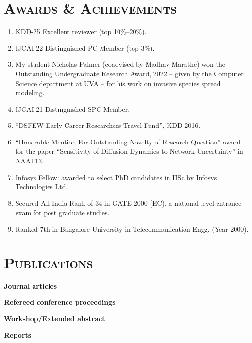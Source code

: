 \documentclass[margin,10pt]{res}
\begin{document}
\begin{resume}
\section{\textnormal{\textsc{Awards \& Achievements}}}
\begin{enumerate}[$\circ$]
    \item KDD-25 Excellent reviewer (top 10\%--20\%).
    \item IJCAI-22 Distinguished PC Member (top 3\%).
\item My student Nicholas Palmer (coadvised by Madhav Marathe) won the
Outstanding Undergraduate Research Award, 2022 -- given by the Computer
Science department at UVA -- for his work on invasive species spread
modeling.
    \item IJCAI-21 Distinguished SPC Member.
   \item ``DSFEW Early Career Researchers Travel Fund'', KDD 2016.
\item ``Honorable Mention For Outstanding Novelty of Research
Question'' award for the paper ``Sensitivity of Diffusion Dynamics to
Network Uncertainty'' in AAAI'13.
\item Infosys Fellow: awarded to select
PhD candidates in IISc by Infosys Technologies Ltd. 
\item Secured All India Rank of 34 in GATE 2000 (EC), a national level
entrance exam for post graduate studies.
\item Ranked 7th in Bangalore University in Telecommunication Engg. (Year 2000).
\end{enumerate}

\section{\textnormal{\textsc{Publications}}} 
\noindent\textbf{Journal articles}\\
\begin{etaremune}

\end{etaremune}
\noindent\textbf{Refereed conference proceedings}\\
\begin{etaremune}

\end{etaremune}
\noindent\textbf{Workshop/Extended abstract}\\
\begin{etaremune}

\end{etaremune}
\noindent\textbf{Reports}\\
\begin{etaremune}

\end{etaremune}

\end{resume}
\end{document}
